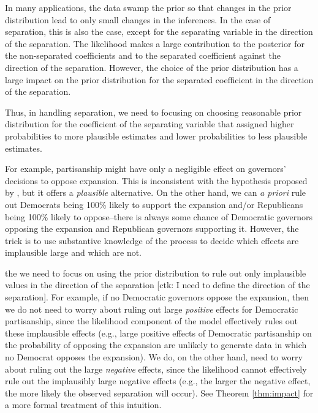 \documentclass[12pt]{article}
\begin{document}
In many applications, the data swamp the prior so that changes in the prior distribution lead to only small changes in the inferences. In the case of separation, this is also the case, except for the separating variable in the direction of the separation. The likelihood makes a large contribution to the posterior for the non-separated coefficients and to the separated coefficient against the direction of the separation. However, the choice of the prior distribution has a large impact on the prior distribution for the separated coefficient in the direction of the separation.

Thus, in handling separation, we need to focusing on choosing reasonable prior distribution for the coefficient of the separating variable that assigned higher probabilities to more plausible estimates and lower probabilities to less plausible estimates.

For example, partisanship might have only a negligible effect on governors' decisions to oppose expansion. This is inconsistent with the hypothesis proposed by \cite{BarrilleauxRainey2014}, but it offers a \emph{plausible} alternative. On the other hand, we can \textit{a priori} rule out Democrats being 100\% likely to support the expansion and/or Republicans being 100\% likely to oppose--there is always some chance of Democratic governors opposing the expansion and Republican governors supporting it. However, the trick is to use substantive knowledge of the process to decide which effects are implausible large and which are not.

 the we need to focus on using the prior distribution to rule out only implausible values in the direction of the separation [ctk: I need to define the direction of the separation]. For example, if no Democratic governors oppose the expansion, then we do not need to worry about ruling out large \textit{positive} effects for Democratic partisanship, since the likelihood component of the model effectively rules out these implausible effects (e.g., large positive effects of Democratic partisanship on the probability of opposing the expansion are unlikely to generate data in which no Democrat opposes the expansion). We do, on the other hand, need to worry about ruling out the large \textit{negative} effects, since the likelihood cannot effectively rule out the implausibly large negative effects (e.g., the larger the negative effect, the more likely the observed separation will occur). See Theorem \ref{thm:impact} for a more formal treatment of this intuition.
\end{document}
